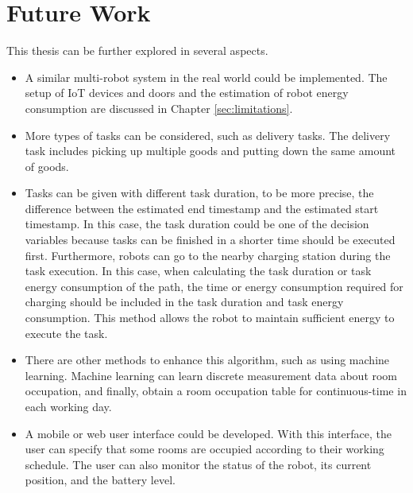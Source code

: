 \section{Future Work}
This thesis can be further explored in several aspects. 
\begin{itemize}
 \item A similar multi-robot system in the real world could be implemented. The setup of IoT devices and doors and the estimation of robot energy consumption are discussed in Chapter \ref{sec:limitations}. 
 \item More types of tasks can be considered, such as delivery tasks. The delivery task includes picking up multiple goods and putting down the same amount of goods. 
 \item Tasks can be given with different task duration, to be more precise, the difference between the estimated end timestamp and the estimated start timestamp. In this case, the task duration could be one of the decision variables because tasks can be finished in a shorter time should be executed first. Furthermore, robots can go to the nearby charging station during the task execution. In this case, when calculating the task duration or task energy consumption of the path, the time or energy consumption required for charging should be included in the task duration and task energy consumption. This method allows the robot to maintain sufficient energy to execute the task.
 \item There are other methods to enhance this algorithm, such as using machine learning. Machine learning can learn discrete measurement data about room occupation, and finally, obtain a room occupation table for continuous-time in each working day. 
 \item A mobile or web user interface could be developed. With this interface, the user can specify that some rooms are occupied according to their working schedule. The user can also monitor the status of the robot, its current position, and the battery level.
\end{itemize}


